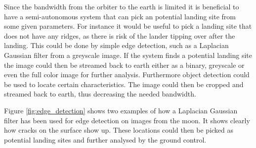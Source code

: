 Since the bandwidth from the orbiter to the earth is limited it is beneficial to have a semi-autonomous system that can pick an potential landing site from some given parameters. For instance it would be useful to pick a landing site that does not have any ridges, as there is risk of the lander tipping over after the landing. This could be done by simple edge detection, such as a Laplacian Gaussian filter from a greyscale image. If the system finds a potential landing site the image could then be streamed back to earth either as a binary, greyscale or even the full color image for further analysis. Furthermore object detection could be used to locate certain characteristics. The image could then be cropped and streamed back to earth, thus decreasing the needed bandwidth.

Figure \ref{fig:edge_detection} shows two examples of how a Laplacian Gaussian filter has been used for edge detection on images from the moon. It shows clearly how cracks on the surface show up. These locations could then be picked as potential landing sites and further analysed by the ground control.

